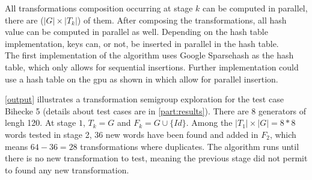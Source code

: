 {All transformations composition occurring at stage $k$ can be computed in parallel, there are ($|G|\times|T_k|$) of them.
After composing the transformations, all hash value can be computed in parallel as well. 
Depending on the hash table implementation, keys can, or not, be inserted in parallel in the hash table.\\
The first implementation of the algorithm uses Google Sparsehash \cite{sparsehash} as the hash table, which only allows for sequential insertions. 
Further implementation could use a hash table on the \gls{gpu} as shown in \cite{wen2011gpu} which allow for parallel insertion.

\autoref{output} illustrates a transformation semigroup exploration for the test case Bihecke 5 (details about test cases are in \autoref{part:results}). 
There are 8 generators of lengh 120. At stage $1$, $T_k=G$ and $F_k=G\cup\{Id\}$. 
Among the $|T_1| \times |G|=8*8$ words tested in stage 2, 36 new words have been found and added in $F_2$, which means $64-36=28$ transformations where duplicates. 
The algorithm runs until there is no new transformation to test, meaning the previous stage did not permit to found any new transformation.

}
